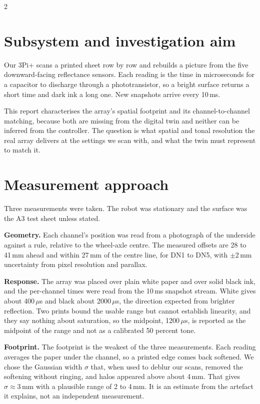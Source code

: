 \documentclass[a4paper,10pt]{article}
\begin{document}
\ReportHeader

\begin{multicols*}{2}
\raggedcolumns

\section*{Subsystem and investigation aim}
Our 3Pi+ scans a printed sheet row by row and rebuilds a picture from the five
downward-facing reflectance sensors. Each reading is the time in microseconds for
a capacitor to discharge through a phototransistor, so a bright surface returns a
short time and dark ink a long one. New snapshots arrive every 10\,ms.

This report characterises the array's spatial footprint and its channel-to-channel
matching, because both are missing from the digital twin and neither can be
inferred from the controller. The question is what spatial and tonal resolution
the real array delivers at the settings we scan with, and what the twin must
represent to match it.

\section*{Measurement approach}
Three measurements were taken. The robot was stationary and the surface was the
A3 test sheet unless stated.

\textbf{Geometry.} Each channel's position was read from a photograph of the
underside against a rule, relative to the wheel-axle centre. The measured offsets
are 28 to 41\,mm ahead and within 27\,mm of the centre line, for DN1 to DN5, with
$\pm$2\,mm uncertainty from pixel resolution and parallax.

\textbf{Response.} The array was placed over plain white paper and over solid
black ink, and the per-channel times were read from the 10\,ms snapshot stream.
White gives about 400\,$\mu$s and black about 2000\,$\mu$s, the direction expected
from brighter reflection. Two prints bound the usable range but cannot establish
linearity, and they say nothing about saturation, so the midpoint, 1200\,$\mu$s, is
reported as the midpoint of the range and not as a calibrated 50 percent tone.

\textbf{Footprint.} The footprint is the weakest of the three measurements. Each
reading averages the paper under the channel, so a printed edge comes back
softened. We chose the Gaussian width $\sigma$ that, when used to deblur our scans,
removed the softening without ringing, and halos appeared above about 4\,mm. That
gives $\sigma\approx3$\,mm with a plausible range of 2 to 4\,mm. It is an estimate
from the artefact it explains, not an independent measurement.


\end{multicols*}
\end{document}
